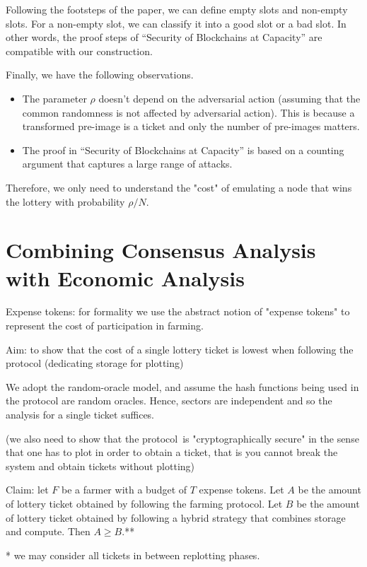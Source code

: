 \documentclass[12pt,draftcls,onecolumn]{IEEEtran}
\begin{document}
Following the footsteps of the paper, we can define empty slots and non-empty slots. For a non-empty slot, we can classify it into a good slot or a bad slot. In other words, the proof steps of ``Security of Blockchains at Capacity''  are compatible with our construction. 

Finally, we have the following observations.
\begin{itemize}
    \item The parameter $\rho$ doesn't depend on the adversarial action (assuming that the common randomness is not affected by adversarial action). This is because a transformed pre-image is a ticket and only the number of pre-images matters. 
    \item The proof in ``Security of Blockchains at Capacity'' is based on a counting argument that captures a large range of attacks.
\end{itemize}

Therefore, we only need to understand the "cost" of emulating a node that wins the lottery with probability $\rho / N$. 

\section{Combining Consensus Analysis with Economic Analysis}

Expense tokens: for formality we use the abstract notion of "expense tokens" to represent the cost of participation in farming.

Aim: to show that the cost of a single lottery ticket is lowest when following the protocol (dedicating storage for plotting)

We adopt the random-oracle model, and assume the hash functions being used in the protocol are random oracles. Hence, sectors are independent and so the analysis for a single ticket suffices.

(we also need to show that the protocol is "cryptographically secure" in the sense that one has to plot in order to obtain a ticket, that is you cannot break the system and obtain tickets without plotting)


Claim: let $F$ be a farmer with a budget of $T$ expense tokens. Let $A$ be the amount of lottery ticket obtained by following the farming protocol. Let $B$ be the amount of lottery ticket obtained by following a hybrid strategy that combines storage and compute. Then $A \geq B$.**

* we may consider all tickets in between replotting phases.
\end{document}
